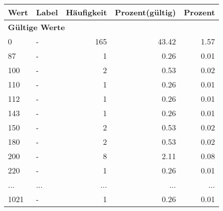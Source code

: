      \begin{longtable}{lXrrr}
     \toprule
     \textbf{Wert} & \textbf{Label} & \textbf{Häufigkeit} & \textbf{Prozent(gültig)} & \textbf{Prozent} \\
     \endhead
     \midrule
     \multicolumn{5}{l}{\textbf{Gültige Werte}}\\
        0 & \multicolumn{1}{X}{-} & %
          \num{165} &
          \num[round-mode=places,round-precision=2]{43,42} &
          \num[round-mode=places,round-precision=2]{1,57} \\
        87 & \multicolumn{1}{X}{-} & %
          \num{1} &
          \num[round-mode=places,round-precision=2]{0,26} &
          \num[round-mode=places,round-precision=2]{0,01} \\
        100 & \multicolumn{1}{X}{-} & %
          \num{2} &
          \num[round-mode=places,round-precision=2]{0,53} &
          \num[round-mode=places,round-precision=2]{0,02} \\
        110 & \multicolumn{1}{X}{-} & %
          \num{1} &
          \num[round-mode=places,round-precision=2]{0,26} &
          \num[round-mode=places,round-precision=2]{0,01} \\
        112 & \multicolumn{1}{X}{-} & %
          \num{1} &
          \num[round-mode=places,round-precision=2]{0,26} &
          \num[round-mode=places,round-precision=2]{0,01} \\
        143 & \multicolumn{1}{X}{-} & %
          \num{1} &
          \num[round-mode=places,round-precision=2]{0,26} &
          \num[round-mode=places,round-precision=2]{0,01} \\
        150 & \multicolumn{1}{X}{-} & %
          \num{2} &
          \num[round-mode=places,round-precision=2]{0,53} &
          \num[round-mode=places,round-precision=2]{0,02} \\
        180 & \multicolumn{1}{X}{-} & %
          \num{2} &
          \num[round-mode=places,round-precision=2]{0,53} &
          \num[round-mode=places,round-precision=2]{0,02} \\
        200 & \multicolumn{1}{X}{-} & %
          \num{8} &
          \num[round-mode=places,round-precision=2]{2,11} &
          \num[round-mode=places,round-precision=2]{0,08} \\
        220 & \multicolumn{1}{X}{-} & %
          \num{1} &
          \num[round-mode=places,round-precision=2]{0,26} &
          \num[round-mode=places,round-precision=2]{0,01} \\
       ... & ... & ... & ... & ... \\
        1021 & \multicolumn{1}{X}{-} & %
          \num{1} &
          \num[round-mode=places,round-precision=2]{0,26} &
          \num[round-mode=places,round-precision=2]{0,01} \\


\end{longtable}
